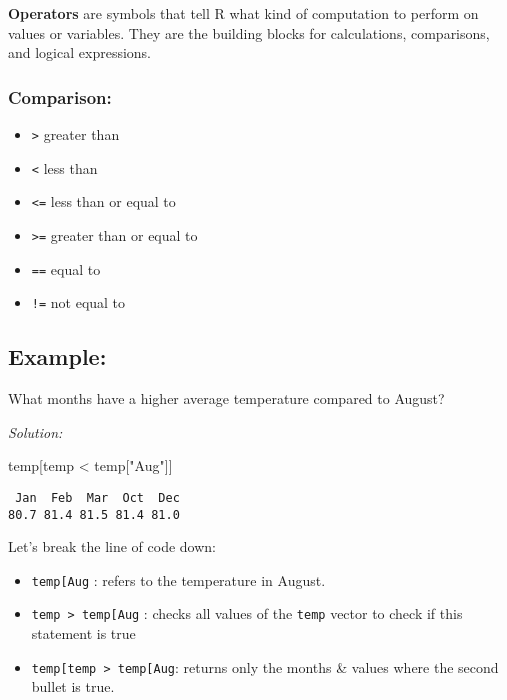 \documentclass[
  letterpaper,
  DIV=11,
  numbers=noendperiod]{scrreprt}
\newenvironment{Shaded}{\begin{snugshade}}{\end{snugshade}}
\newcommand{\NormalTok}[1]{\textcolor[rgb]{0.00,0.23,0.31}{#1}}
\newcommand{\SpecialCharTok}[1]{\textcolor[rgb]{0.37,0.37,0.37}{#1}}
\newcommand{\StringTok}[1]{\textcolor[rgb]{0.13,0.47,0.30}{#1}}
\providecommand{\tightlist}{%
  \setlength{\itemsep}{0pt}\setlength{\parskip}{0pt}}\usepackage{longtable,booktabs,array}
\begin{document}
\textbf{Operators} are symbols that tell R what kind of computation to
perform on values or variables. They are the building blocks for
calculations, comparisons, and logical expressions.

\subsubsection*{Comparison:}\label{comparison}

\begin{itemize}
\tightlist
\item
  \texttt{\textgreater{}} greater than
\item
  \texttt{\textless{}} less than
\item
  \texttt{\textless{}=} less than or equal to
\item
  \texttt{\textgreater{}=} greater than or equal to
\item
  \texttt{==} equal to
\item
  \texttt{!=} not equal to
\end{itemize}

\subsection*{Example:}\label{example-1}

What months have a higher average temperature compared to August?

\emph{Solution:}

\begin{Shaded}
\begin{Highlighting}[]
\NormalTok{temp[temp }\SpecialCharTok{\textless{}}\NormalTok{ temp[}\StringTok{"Aug"}\NormalTok{]]}
\end{Highlighting}
\end{Shaded}

\begin{verbatim}
 Jan  Feb  Mar  Oct  Dec 
80.7 81.4 81.5 81.4 81.0 
\end{verbatim}

Let's break the line of code down:

\begin{itemize}
\item
  \texttt{temp{[}\textquotesingle{}Aug\textquotesingle{}{]}} : refers to
  the temperature in August.
\item
  \texttt{temp\ \textgreater{}\ temp{[}\textquotesingle{}Aug\textquotesingle{}{]}}
  : checks all values of the \texttt{temp} vector to check if this
  statement is true
\item
  \texttt{temp{[}temp\ \textgreater{}\ temp{[}\textquotesingle{}Aug\textquotesingle{}{]}{]}}:
  returns only the months \& values where the second bullet is true.
\end{itemize}
\end{document}
